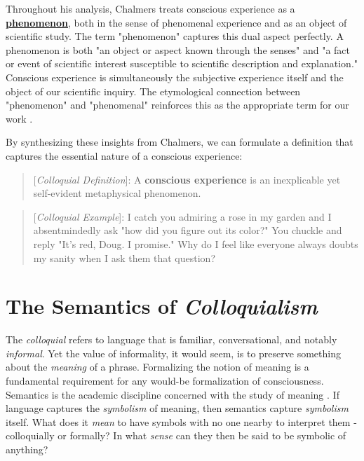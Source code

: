 \documentclass[runningheads]{llncs}
\begin{document}
Throughout his analysis, Chalmers treats conscious experience as a \href{https://dna-platform.github.io/inexplicable-phenomena/dictionary/phenomenon.html}{\textbf{phenomenon}}\xspace, both in the sense of phenomenal experience and as an object of scientific study. The term "phenomenon" captures this dual aspect perfectly. A phenomenon is both "an object or aspect known through the senses" and "a fact or event of scientific interest susceptible to scientific description and explanation." Conscious experience is simultaneously the subjective experience itself and the object of our scientific inquiry. The etymological connection between "phenomenon" and "phenomenal" reinforces this as the appropriate term for our work \cite{Bader2022}.

By synthesizing these insights from Chalmers, we can formulate a definition that captures the essential nature of a conscious experience:

\begin{quote}
[\emph{Colloquial Definition}]: A \textbf{conscious experience} is an inexplicable yet self-evident metaphysical phenomenon.
\end{quote}

\begin{quote}
[\emph{Colloquial Example}]: I catch you admiring a rose in my garden and I absentmindedly ask "how did you figure out its color?" You chuckle and reply "It's red, Doug. I promise." Why do I feel like everyone always doubts my sanity when I ask them that question?
\end{quote}

\section{The Semantics of \emph{Colloquialism}}

The \emph{colloquial} refers to language that is familiar, conversational, and notably \emph{informal}. Yet the value of informality, it would seem, is to preserve something about the \emph{meaning} of a phrase. Formalizing the notion of meaning is a fundamental requirement for any would-be formalization of consciousness. Semantics is the academic discipline concerned with the study of meaning \cite{Grice1957}. If language captures the \emph{symbolism} of meaning, then semantics capture \emph{symbolism} itself. What does it \emph{mean} to have symbols with no one nearby to interpret them - colloquially or formally? In what \emph{sense} can they then be said to be symbolic of anything?
\end{document}
